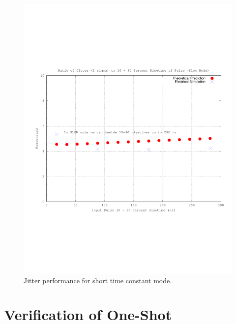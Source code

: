 \documentclass[12pt,oneside,final]{siuethesis}
\theoremstyle{definition}
\begin{document}
\begin{figure}[htbp!]
	\centering
 	\includegraphics[scale=0.8,keepaspectratio=true]{../Design_Reports/CFD_circuit_report/images/jitter_slow_mode.pdf}
 	\caption{Jitter performance for short time constant mode.}
 	\label{FIG:JITTER_SLOW}
\end{figure}

\section{Verification of One-Shot}
\end{document}

